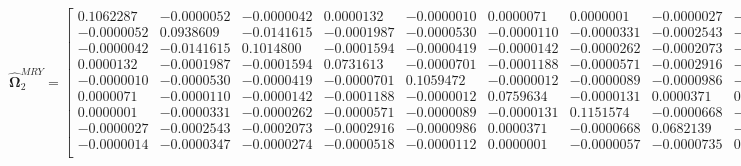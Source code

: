 \documentclass{article}\usepackage[]{graphicx}\usepackage[]{xcolor}
\def\bs{\boldsymbol}
\begin{document}
 \[
 \widehat{\bs{\Omega}}_{2}^{MRY} = 
 
  \begin{bmatrix}
 

 
 0.1062287 & -0.0000052 & -0.0000042 & 0.0000132 & -0.0000010 & 0.0000071 & 0.0000001 & -0.0000027 & -0.0000014\\
 
 -0.0000052 & 0.0938609 & -0.0141615 & -0.0001987 & -0.0000530 & -0.0000110 & -0.0000331 & -0.0002543 & -0.0000347\\
 
 -0.0000042 & -0.0141615 & 0.1014800 & -0.0001594 & -0.0000419 & -0.0000142 & -0.0000262 & -0.0002073 & -0.0000274\\
 
 0.0000132 & -0.0001987 & -0.0001594 & 0.0731613 & -0.0000701 & -0.0001188 & -0.0000571 & -0.0002916 & -0.0000518\\
 
 -0.0000010 & -0.0000530 & -0.0000419 & -0.0000701 & 0.1059472 & -0.0000012 & -0.0000089 & -0.0000986 & -0.0000112\\
 
 0.0000071 & -0.0000110 & -0.0000142 & -0.0001188 & -0.0000012 & 0.0759634 & -0.0000131 & 0.0000371 & 0.0000001\\
 
 0.0000001 & -0.0000331 & -0.0000262 & -0.0000571 & -0.0000089 & -0.0000131 & 0.1151574 & -0.0000668 & -0.0000057\\
 
 -0.0000027 & -0.0002543 & -0.0002073 & -0.0002916 & -0.0000986 & 0.0000371 & -0.0000668 & 0.0682139 & -0.0000735\\
 
 -0.0000014 & -0.0000347 & -0.0000274 & -0.0000518 & -0.0000112 & 0.0000001 & -0.0000057 & -0.0000735 & 0.1083507\\
 \end{bmatrix}
 \]
 
\end{document}
